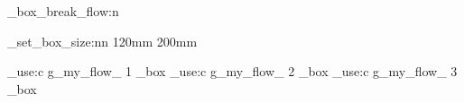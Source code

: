 \documentclass{article}
\begin{document}
\ExplSyntaxOn

\my_box_break_flow:n { \lipsum[1-2] }

\my_set_box_size:nn { 120mm } { 200mm }

\lipsum[2]
\par

\box_use:c { g_my_flow_ 1 _box }
\box_use:c { g_my_flow_ 2 _box }
\box_use:c { g_my_flow_ 3 _box }

\par
\lipsum[2] 

\ExplSyntaxOff
\end{document}

